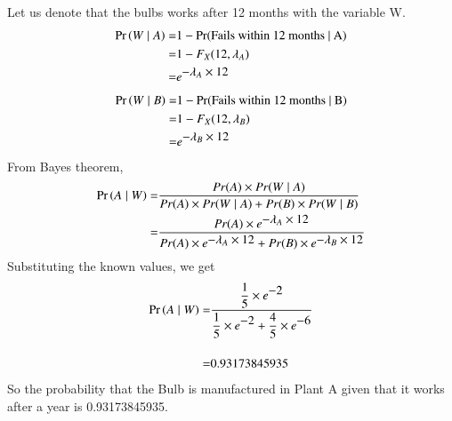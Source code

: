\documentclass[journal,12pt,twocolumn]{IEEEtran}
\begin{document}
Let us denote that the bulbs works after 12 months with the variable W.
\begin{align}
\text{$\Pr\left(W \mid A\right)$} = & 1 -\notag \text{Pr(Fails within 12 months $\mid$ A)}\\
    = & 1 - F_X(12,\lambda_A)                       \\
    = & {e}^{\displaystyle - \lambda_A \times 12} 
\end{align}
\begin{align}
    \text{$\Pr\left(W \mid B\right)$} = & 1 -\notag \text{Pr(Fails within 12 months $\mid$ B)}\\
        = & 1 - F_X(12,\lambda_B)                       \\
        = & {e}^{\displaystyle - \lambda_B \times 12} 
\end{align}
From Bayes theorem,\\
\begin{align}
    \Pr\left(A \mid W\right) = & \displaystyle{\frac{Pr(A) \times Pr(W \mid A)}{Pr(A) \times Pr(W \mid A) + Pr(B) \times Pr(W \mid B)}}\\
    = & \displaystyle{\frac{Pr(A) \times {e}^{\displaystyle - \lambda_A \times 12}}{Pr(A) \times {e}^{\displaystyle - \lambda_A \times 12} + Pr(B) \times {e}^{\displaystyle - \lambda_B \times 12} }}
\end{align}
Substituting the known values, we get
\begin{align}
    \Pr\left(A \mid W\right) = &\displaystyle{\frac{\displaystyle{\frac{1}{5}} \times {e}^{\displaystyle - 2}}{\displaystyle{\frac{1}{5}} \times {e}^{\displaystyle - 2} + \displaystyle{\frac{4}{5}} \times {e}^{\displaystyle - 6} }}\\[0.4cm]
    = & 0.93173845935
\end{align}
So the probability that the Bulb is manufactured in Plant A given that it works after a year is 0.93173845935.
\pagebreak
\end{document}
